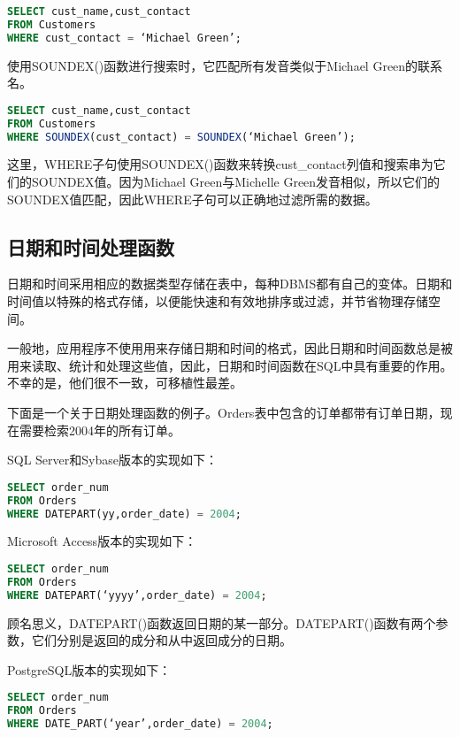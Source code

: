 \begin{lstlisting}[language=SQL]
SELECT cust_name,cust_contact
FROM Customers
WHERE cust_contact = ‘Michael Green’;
\end{lstlisting}

使用SOUNDEX()函数进行搜索时，它匹配所有发音类似于Michael Green的联系名。

\begin{lstlisting}[language=SQL]
SELECT cust_name,cust_contact
FROM Customers
WHERE SOUNDEX(cust_contact) = SOUNDEX(‘Michael Green’);
\end{lstlisting}

这里，WHERE子句使用SOUNDEX()函数来转换cust\_contact列值和搜索串为它们的SOUNDEX值。因为Michael Green与Michelle Green发音相似，所以它们的SOUNDEX值匹配，因此WHERE子句可以正确地过滤所需的数据。


\subsection{日期和时间处理函数}

日期和时间采用相应的数据类型存储在表中，每种DBMS都有自己的变体。日期和时间值以特殊的格式存储，以便能快速和有效地排序或过滤，并节省物理存储空间。

一般地，应用程序不使用用来存储日期和时间的格式，因此日期和时间函数总是被用来读取、统计和处理这些值，因此，日期和时间函数在SQL中具有重要的作用。不幸的是，他们很不一致，可移植性最差。

下面是一个关于日期处理函数的例子。Orders表中包含的订单都带有订单日期，现在需要检索2004年的所有订单。

SQL Server和Sybase版本的实现如下：

\begin{lstlisting}[language=SQL]
SELECT order_num
FROM Orders
WHERE DATEPART(yy,order_date) = 2004;
\end{lstlisting}

Microsoft Access版本的实现如下：

\begin{lstlisting}[language=SQL]
SELECT order_num
FROM Orders
WHERE DATEPART(‘yyyy’,order_date) = 2004;
\end{lstlisting}

顾名思义，DATEPART()函数返回日期的某一部分。DATEPART()函数有两个参数，它们分别是返回的成分和从中返回成分的日期。

PostgreSQL版本的实现如下：

\begin{lstlisting}[language=SQL]
SELECT order_num
FROM Orders
WHERE DATE_PART(‘year’,order_date) = 2004;
\end{lstlisting}

